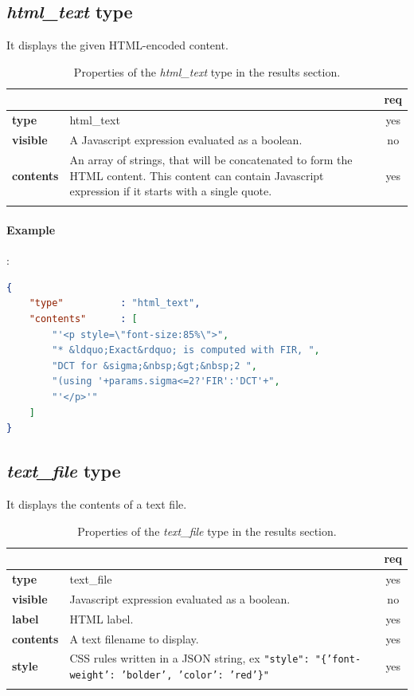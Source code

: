 \subsection{ \emph{html\_text} type}

It displays the given HTML-encoded content.

\begin{longtable}{|>{\bf}L{\linewidth}|L{\linewidth}|c|}
\hline
{}     &  & {\bf req} \tabularnewline 
\hline \hline
 type      & html\_text  & yes \\ \hline
 visible    & A Javascript expression evaluated as a boolean. & no \\ \hline
 contents  & An array of strings, that will be concatenated to form the HTML 
             content. This content can contain Javascript expression if it starts
            with a single quote. & yes \\ \hline
\caption{Properties of the \emph{html\_text} type in the results section.}
\end{longtable}

\paragraph{Example}:\\
\begin{lstlisting}[language=json,firstnumber=1]
{ 
    "type"          : "html_text", 
    "contents"      : [
        "'<p style=\"font-size:85%\">",
        "* &ldquo;Exact&rdquo; is computed with FIR, ",
        "DCT for &sigma;&nbsp;&gt;&nbsp;2 ",
        "(using '+params.sigma<=2?'FIR':'DCT'+",
        "'</p>'" 
    ] 
}
\end{lstlisting}


\subsection{ \emph{text\_file} type}

It displays the contents of a text file.

\begin{longtable}{|>{\bf}L{\linewidth}|L{\linewidth}|c|}
\hline
{}     &  & {\bf req} \tabularnewline 
\hline \hline
 type      & text\_file  & yes \\ \hline
 visible    & Javascript expression evaluated as a boolean. & no \\ \hline
 label     & HTML label. & yes \\ \hline
 contents  & A text filename to display. & yes \\ \hline
 style     & CSS rules written in a JSON string, ex 
             \texttt{"style": "\{'font-weight': 'bolder', 'color': 'red'\}"} & yes \\ \hline
\caption{Properties of the \emph{text\_file} type in the results section.}
\end{longtable}

